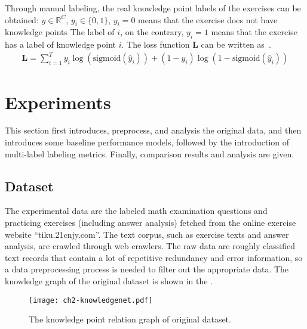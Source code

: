 Through manual labeling, the real knowledge point labels of the exercises can be obtained: \(y\in \mathbb{R}^C\), \(y_i\in \{0,1\} \), \(y_i=0\) means that the exercise does not have knowledge points The label of \(i\), on the contrary, \(y_i=1\) means that the exercise has a label of knowledge point \(i\). The loss function \(\mathbf{L}\) can be written as~\eqname{\ref{fml:ch2-lossfunction}}.
\begin{align}\label{fml:ch2-lossfunction}
    \mathbf{L}=\sum_{i=1}^{T} y_i \log (\text{sigmoid}(\hat{y}_i))+(1-y_i) \log (1-\text{sigmoid}(\hat{y}_i))
\end{align}

\section{Experiments}
This section first introduces, preprocess, and analysis the original data, and then introduces some baseline performance models, followed by the introduction of multi-label labeling metrics. Finally, comparison results and analysis are given.
\subsection{Dataset}
The experimental data are the labeled math examination questions and practicing exercises (including answer analysis) fetched from the online exercise website ``tiku.21cnjy.com''. The text corpus, such as exercise texts and answer analysis, are crawled through web crawlers. The raw data are roughly classified text records that contain a lot of repetitive redundancy and error information, so a data preprocessing process is needed to filter out the appropriate data. The knowledge graph of the original dataset is shown in the \figname{\ref{fig:ch2-model-knowledgenet}}.
\begin{figure}[htbp!]
    \centering
    \texttt{[image: ch2-knowledgenet.pdf]}
    \caption{The knowledge point relation graph of original dataset.}\label{fig:ch2-model-knowledgenet}
\end{figure}

